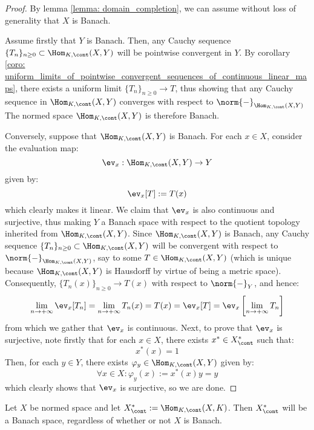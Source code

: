             \begin{proof}
                By lemma \ref{lemma: domain_completion}, we can assume without loss of generality that $X$ is Banach.
                
                Assume firstly that $Y$ is Banach. Then, any Cauchy sequence $\{T_n\}_{n \geq 0} \subset \Hom_{K, \cont}(X, Y)$ will be pointwise convergent in $Y$. By corollary \ref{coro: uniform_limits_of_pointwise_convergent_sequences_of_continuous_linear_maps}, there exists a uniform limit $\{T_n\}_{n \geq 0} \to T$, thus showing that any Cauchy sequence in $\Hom_{K, \cont}(X, Y)$ converges with respect to $\norm{-}_{\Hom_{K, \cont}(X, Y)}$ The normed space $\Hom_{K, \cont}(X, Y)$ is therefore Banach.

                Conversely, suppose that $\Hom_{K, \cont}(X, Y)$ is Banach. For each $x \in X$, consider the evaluation map:
                    $$\ev_x: \Hom_{K, \cont}(X, Y) \to Y$$
                given by:
                    $$\ev_x[T] := T(x)$$
                which clearly makes it linear. We claim that $\ev_x$ is also continuous and surjective, thus making $Y$ a Banach space with respect to the quotient topology inherited from $\Hom_{K, \cont}(X, Y)$. Since $\Hom_{K, \cont}(X, Y)$ is Banach, any Cauchy sequence $\{T_n\}_{n \geq 0} \subset \Hom_{K, \cont}(X, Y)$ will be convergent with respect to $\norm{-}_{\Hom_{K, \cont}(X, Y)}$, say to some $T \in \Hom_{K, \cont}(X, Y)$ (which is unique because $\Hom_{K, \cont}(X, Y)$ is Hausdorff by virtue of being a metric space). Consequently, $\{T_n(x)\}_{n \geq 0} \to T(x)$ with respect to $\norm{-}_Y$, and hence:
                    $$\lim_{n \to +\infty} \ev_x[T_n] = \lim_{n \to +\infty} T_n(x) = T(x) = \ev_x[T] = \ev_x\left[ \lim_{n \to +\infty} T_n \right]$$
                from which we gather that $\ev_x$ is continuous. Next, to prove that $\ev_x$ is surjective, note firstly that for each $x \in X$, there exists $x^* \in X^*_{\cont}$ such that:
                    $$x^*(x) = 1$$
                Then, for each $y \in Y$, there exists $\varphi_y \in \Hom_{K, \cont}(X, Y)$ given by:
                    $$\forall x \in X: \varphi_y(x) := x^*(x) y = y$$
                which clearly shows that $\ev_x$ is surjective, so we are done.
            \end{proof}
        \begin{corollary} \label{coro: duals_of_normed_space_are_banach}
            Let $X$ be normed space and let $X^*_{\cont} := \Hom_{K, \cont}(X, K)$. Then $X^*_{\cont}$ will be a Banach space, regardless of whether or not $X$ is Banach.
        \end{corollary}
